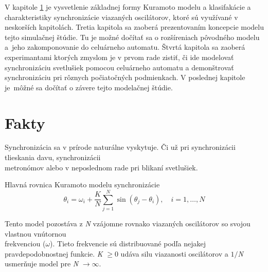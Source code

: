 \documentclass[a4paper, 11pt]{article}
\begin{document}

V kapitole \ref{sec_facts} je vysvetlenie základnej formy Kuramoto modelu a klasifakácie a charakteristiky synchronizácie viazaných oscilátorov, ktoré sú využívané v neskorších kapitolách. Tretia kapitola sa zaoberá prezentovaním koncepcie 
modelu tejto simulačnej štúdie. Tu je možné dočítať sa o rozšíreniach pôvodného modelu a~jeho zakomponovanie do celuárneho automatu. Štvrtá kapitola sa zaoberá experimantami ktorých zmyslom je v prvom rade zistiť, či ide modelovať synchronizáciu svetlušiek pomocou celuárneho automatu a demonštrovať synchronizáciu pri rôznych počiatočných podmienkach. V poslednej kapitole je~môžné sa dočítať o závere tejto modelačnej štúdie.














\pagebreak 
\section{Fakty} \label{sec_facts}


Synchronizácia sa v prírode naturálne vyskytuje. Či už pri synchronizácii tlieskania davu, synchronizácii\\ metronómov alebo v neposlednom rade pri blikaní svetlušiek. \cite{Svetlusky}\cite{Strogatz}\cite{Kuramoto2}


\vspace{1em}
\noindent
Hlavná rovnica Kuramoto modelu synchronizácie\cite{Strogatz}\cite{Kuramoto2}
\begin{equation} \label{kuramoto_eq}
    \theta_i = \omega_i + \frac{K}{N} \sum_{j=1}^{N} \sin(\theta_j - \theta_i), \hspace{1em} i = 1,\dots, N
\end{equation}

Tento model pozostáva z \textit{N} vzájomne rovnako viazaných oscilátorov so svojou vlastnou vnútornou\\ frekvenciou ($\omega$). Tieto frekvencie sú distribuované podľa nejakej pravdepodobnostnej funkcie. \textit{K} $\geq 0$ udáva silu viazanosti oscilátorov a $1/$\textit{N} usmerňuje model pre \textit{N} $\to\infty$.\cite{Strogatz}
\end{document}
